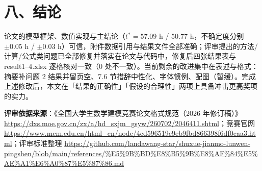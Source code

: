 \documentclass[12pt,a4paper]{ctexart}
\begin{document}
\section{八、结论}

论文的模型框架、数值实现与主结论（$t^*=57.09$ h / $50.77$ h，不确定度分别 $\pm0.05$ h / $\pm0.03$ h）可信，附件数据引用与结果文件全部准确；评审提出的方法/计算/公式类问题已全部修复并落实在论文与代码中，修复后四张结果表与 result1--4.xlsx 逐格核对一致（0 处不一致）。当前剩余的改进集中在表述与格式：摘要补问题 2 结果并留页空、7.6 节措辞中性化、字体惯例、配图（暂缓）。完成上述修改后，本文在「结果的正确性」「假设的合理性」两项上具备冲击更高奖项的实力。

\medskip
{\textbf{评审依据来源}：《全国大学生数学建模竞赛论文格式规范（2026 年修订稿）》\url{https://dxs.moe.gov.cn/zx/a/hd_sxjm_gsyw/260702/2046411.shtml}；竞赛官网 \url{https://www.mcm.edu.cn/html_cn/node/4cd596519c9eb9fbd866398f6df0caa3.html}；评审标准整理 \url{https://github.com/landawang-star/shuxue-jianmo-lunwen-pingshen/blob/main/references/%E5%9B%BD%E8%B5%9B%E8%AF%84%E5%AE%A1%E6%A0%87%E5%87%86.md}}
\end{document}
